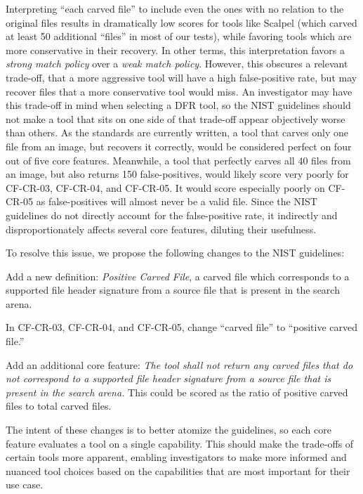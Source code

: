 Interpreting ``each carved file'' to include even the ones with no relation to the original files results in dramatically low scores for tools like Scalpel (which carved at least 50 additional ``files'' in most of our tests), while favoring tools which are more conservative in their recovery.
In other terms, this interpretation favors a \emph{strong match policy} over a \emph{weak match policy}.
However, this obscures a relevant trade-off, that a more aggressive tool will have a high false-positive rate, but may recover files that a more conservative tool would miss.
An investigator may have this trade-off in mind when selecting a DFR tool, so the NIST guidelines should not make a tool that sits on one side of that trade-off appear objectively worse than others.
As the standards are currently written, a tool that carves only one file from an image, but recovers it correctly, would be considered perfect on four out of five core features.
Meanwhile, a tool that perfectly carves all 40 files from an image, but also returns 150 false-positives, would likely score very poorly for CF-CR-03, CF-CR-04, and CF-CR-05.
It would score especially poorly on CF-CR-05 as false-positives will almost never be a valid file.
Since the NIST guidelines do not directly account for the false-positive rate, it indirectly and disproportionately affects several core features, diluting their usefulness.

To resolve this issue, we propose the following changes to the NIST guidelines:
\begin{arabiclist}
 \item Add a new definition: \emph{Positive Carved File}, a carved file which corresponds to a supported file header signature from a source file that is present in the search arena. 
 \item In CF-CR-03, CF-CR-04, and CF-CR-05, change ``carved file'' to ``positive carved file.''
 \item Add an additional core feature: \emph{The tool shall not return any carved files that do not correspond to a supported file header signature from a source file that is present in the search arena.} This could be scored as the ratio of positive carved files to total carved files.
\end{arabiclist}

The intent of these changes is to better atomize the guidelines, so each core feature evaluates a tool on a single capability.
This should make the trade-offs of certain tools more apparent, enabling investigators to make more informed and nuanced tool choices based on the capabilities that are most important for their use case.

